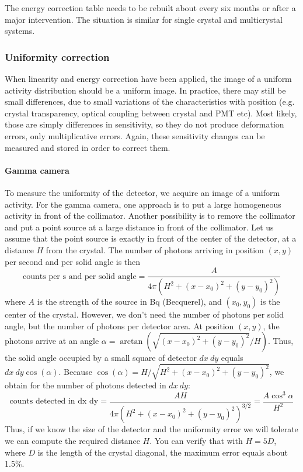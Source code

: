 \documentclass[11pt,oneside]{article}
\begin{document}
The energy correction table needs to be rebuilt about every six months or
after a major intervention. The situation is similar for single crystal and
multicrystal systems.


\subsubsection{Uniformity correction}
When linearity and energy correction have been applied, the image of a uniform
activity distribution should be a uniform image. In practice, there may still
be small differences, due to small variations of the characteristics with
position (e.g. crystal transparency, optical coupling between crystal and PMT
etc). Most likely, those are simply differences in sensitivity, so they do not
produce deformation errors, only multiplicative errors. Again, these
sensitivity changes can be measured and stored in order to correct them.

\paragraph{Gamma camera}
To measure the uniformity of the detector, we acquire an image of
a uniform activity. For the gamma camera, one approach is to put a
large homogeneous activity in front of the collimator. Another
possibility is to remove the collimator and put a point source at a
large distance in front of the collimator. Let us assume that the
point source is exactly in front of the center of the detector, at a
distance $H$ from the crystal. The number of photons arriving in
position $(x,y)$ per second and per solid angle is then
\begin{equation}
  \mbox{counts  per s and per solid angle} 
     = \frac{A}{4 \pi (H^2 + (x-x_0)^2 +(y-y_0)^2)}
\end{equation}
where $A$ is the strength of the source in Bq (Becquerel), and $(x_0, y_0)$ is
the center of the crystal. However, we don't need the number of
photons per solid angle, but the number of photons per detector
area. At position $(x,y)$, the photons arrive at an angle 
$\alpha = \arctan(\sqrt{(x-x_0)^2 +(y-y_0)^2}/ H)$. Thus, the solid
angle occupied by a small square of detector $dx\ dy$ equals $dx\ dy
\cos(\alpha)$. Because $\cos(\alpha) = H / \sqrt{H^2 + (x-x_0)^2
  +(y-y_0)^2}$, we obtain for the number of photons detected in $dx\
dy$:
\begin{equation}
  \mbox{counts detected in dx dy} 
     = \frac{A H}{4 \pi (H^2 + (x-x_0)^2 +(y-y_0)^2)^{3/2}}
     = \frac{A \cos^3\alpha}{H^2}
\end{equation}
%
Thus, if we know the size of the detector and the uniformity error we
will tolerate we can compute the required distance $H$.  You can
verify that with $H = 5 D$, where $D$ is the length of the crystal diagonal,
the maximum error equals about 1.5\%.
\end{document}
